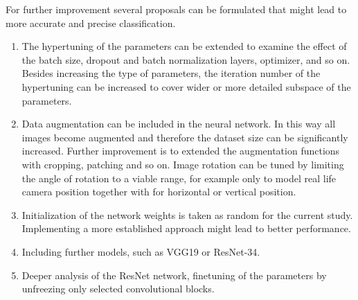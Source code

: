 \documentclass[10pt, final]{article}
\begin{document}
For further improvement several proposals can be formulated that might lead to more accurate and precise classification.

\begin{enumerate}
	\item The hypertuning of the parameters can be extended to examine the effect of the batch size, dropout and batch
	      normalization layers, optimizer, and so on.
	      Besides increasing the type of parameters, the iteration number of the hypertuning can be increased to cover wider
	      or more detailed subspace of the parameters.
	\item Data augmentation can be included in the neural network.
	      In this way all images become augmented and therefore the dataset size can be significantly increased.
	      Further improvement is to extended the augmentation functions with cropping, patching and so on.
	      Image rotation can be tuned by limiting the angle of rotation to a viable range, for example only \textdegree
	      to model real life camera position together with \textdegree for horizontal or vertical position.
	\item Initialization of the network weights is taken as random for the current study.
	      Implementing a more established approach might lead to better performance.
	\item Including further models, such as VGG19 or ResNet-34.
	\item Deeper analysis of the ResNet network, finetuning of the parameters by unfreezing only selected convolutional blocks.
\end{enumerate}

\newpage
\listoffigures
\listoftables
\newpage
\printbibliography
\end{document}
